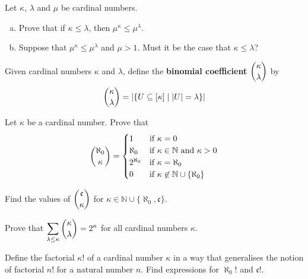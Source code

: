 \begin{chapex}
Let $\kappa$, $\lambda$ and $\mu$ be cardinal numbers.
\begin{enumerate}[(a)]
\item Prove that if $\kappa \le \lambda$, then $\mu^{\kappa} \le \mu^{\lambda}$.
\item Suppose that $\mu^{\kappa} \le \mu^{\lambda}$ and $\mu > 1$. Must it be the case that $\kappa \le \lambda$?
\end{enumerate}
\end{chapex}

\begin{definition}
Given cardinal numbers $\kappa$ and $\lambda$, define the \textbf{binomial coefficient} $\dbinom{\kappa}{\lambda}$ by
\[ \dbinom{\kappa}{\lambda} = |\{ U \subseteq [\kappa] \mid |U| = \lambda \}| \]
\end{definition}

\begin{chapex}
Let $\kappa$ be a cardinal number. Prove that
\[ \dbinom{\aleph_0}{\kappa} = \begin{cases} 1 & \text{if } \kappa = 0 \\ \aleph_0 & \text{if } \kappa \in \mathbb{N} \text{ and } \kappa > 0 \\ 2^{\aleph_0} & \text{if } \kappa = \aleph_0 \\ 0 & \text{if } \kappa \not\in \mathbb{N} \cup \{ \aleph_0 \} \end{cases} \]
\end{chapex}

\begin{chapex}
Find the values of $\dbinom{\mathfrak{c}}{\kappa}$ for $\kappa \in \mathbb{N} \cup \{ \aleph_0, \mathfrak{c} \}$.
\end{chapex}

\begin{chapex}
Prove that $\displaystyle \sum_{\lambda \le \kappa} \dbinom{\kappa}{\lambda} = 2^{\kappa}$ for all cardinal numbers $\kappa$.
\end{chapex}

\begin{chapex}
Define the factorial $\kappa !$ of a cardinal number $\kappa$ in a way that generalises the notion of factorial $n!$ for a natural number $n$. Find expressions for $\aleph_0!$ and $\mathfrak{c}!$.
\end{chapex}

